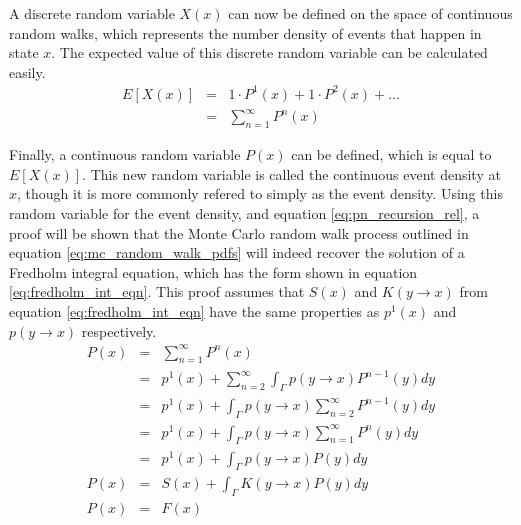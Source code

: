 A discrete random variable $X(x)$ can now be defined on the space of continuous
random walks, which represents the number density of events that happen in 
state $x$. The expected value of this discrete random variable can be calculated
easily.
\begin{eqnarray}
  E[X(x)] & = & 1 \cdot P^1(x) + 1 \cdot P^2(x) + \ldots \nonumber \\
  & = & \sum_{n=1}^{\infty} P^n(x)
  \label{eq:expec_coll_dens}
\end{eqnarray}

Finally, a continuous random variable $P(x)$ can be defined, which is equal to
$E[X(x)]$. This new random variable is called the continuous event density 
at $x$, though it is more commonly refered to simply as the event density.
Using this random variable for the event density, and equation
\ref{eq:pn_recursion_rel}, a proof will be shown that the Monte Carlo random
walk process outlined in equation \ref{eq:mc_random_walk_pdfs} will indeed
recover the solution of a Fredholm integral equation, which has the form shown
in equation \ref{eq:fredholm_int_eqn}. This proof assumes that $S(x)$ and
$K(y \to x)$ from equation \ref{eq:fredholm_int_eqn} have the same properties 
as $p^1(x)$ and $p(y \to x)$ respectively. 
\begin{eqnarray}
  P(x) & = & \sum_{n=1}^{\infty} P^n(x) \nonumber \\
  & = & p^1(x) + \sum_{n=2}^{\infty} \int_{\Gamma} p(y \to x) P^{n-1}(y)dy \nonumber\\
  & = & p^1(x) + \int_{\Gamma} p(y \to x) \sum_{n=2}^{\infty} P^{n-1}(y)dy \nonumber\\
  & = & p^1(x) + \int_{\Gamma} p(y \to x) \sum_{n=1}^{\infty} P^{n}(y)dy \nonumber\\
  & = & p^1(x) + \int_{\Gamma} p(y \to x) P(y)dy \nonumber \\
  P(x) & = & S(x) + \int_{\Gamma} K(y \to x) P(y)dy \nonumber \\
  P(x) & = & F(x) \nonumber
\end{eqnarray}

